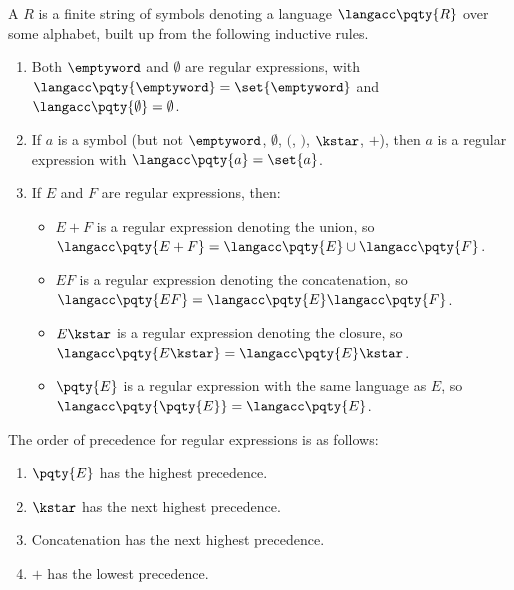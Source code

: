 \begin{definition}
    A  \(R\) is a finite string of symbols denoting a language \(\langacc\pqty{R}\) over some alphabet, built up from the following inductive rules.

    \begin{enumerate}[label=(\arabic*)]
        \item Both \(\emptyword\) and \(\emptyset\) are regular expressions, with \(\langacc\pqty{\emptyword} = \set{\emptyword}\) and \(\langacc\pqty{\emptyset} = \emptyset\).
        \item If \(a\) is a symbol (but not \(\emptyword\), \(\emptyset\), \((\), \()\), \({}\kstar\), \(+\)), then \(a\) is a regular expression with \(\langacc\pqty{a} = \set{a}\).
        \item If \(E\) and \(F\) are regular expressions, then:
        \begin{itemize}
            \item \(E + F\) is a regular expression denoting the union, so \(\langacc\pqty{E + F} = \langacc\pqty{E} \cup \langacc\pqty{F}\).
            \item \(EF\) is a regular expression denoting the concatenation, so \(\langacc\pqty{EF} = \langacc\pqty{E}\langacc\pqty{F}\).
            \item \(E\kstar\) is a regular expression denoting the closure, so \(\langacc\pqty{E\kstar} = \langacc\pqty{E}\kstar\).
            \item \(\pqty{E}\) is a regular expression with the same language as \(E\), so \(\langacc\pqty{\pqty{E}} = \langacc\pqty{E}\).
        \end{itemize}
    \end{enumerate}
\end{definition}

\begin{definition}
    The order of precedence for regular expressions is as follows:
    \begin{enumerate}[label=(\arabic*)]
        \item \(\pqty{E}\) has the highest precedence.
        \item \(\kstar\) has the next highest precedence.
        \item Concatenation has the next highest precedence.
        \item \(+\) has the lowest precedence.
    \end{enumerate}
\end{definition}

